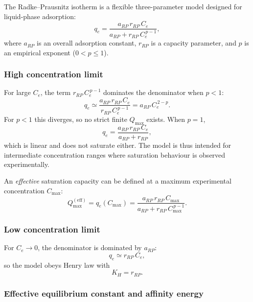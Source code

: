 	The Radke--Prausnitz isotherm is a flexible three-parameter model
	designed for liquid-phase adsorption:
	\begin{equation}
		q_e = \frac{a_{RP}\, r_{RP}\, C_e}{a_{RP} + r_{RP}\, C_e^{\,p-1}},
		\label{eq:RadkePrausnitz}
	\end{equation}
	where $a_{RP}$ is an overall adsorption constant, $r_{RP}$ is a
	capacity parameter, and $p$ is an empirical exponent
	($0 < p \leq 1$).

	\subsubsection{High concentration limit}

	For large $C_e$, the term $r_{RP}\,C_e^{\,p-1}$ dominates the
	denominator when $p < 1$:
	\begin{equation}
		q_e \simeq \frac{a_{RP}\, r_{RP}\, C_e}{r_{RP}\, C_e^{\,p-1}}
		= a_{RP}\, C_e^{\,2-p}.
	\end{equation}
	For $p < 1$ this diverges, so no strict finite $Q_{\max}$ exists.
	When $p = 1$,
	\begin{equation}
		q_e = \frac{a_{RP}\, r_{RP}\, C_e}{a_{RP} + r_{RP}},
	\end{equation}
	which is linear and does not saturate either.  The model is thus
	intended for intermediate concentration ranges where saturation
	behaviour is observed experimentally.

	An \emph{effective} saturation capacity can be defined at a
	maximum experimental concentration $C_{\max}$:
	\begin{equation}
		Q_{\max}^{\mathrm{(eff)}} = q_e(C_{\max})
		= \frac{a_{RP}\, r_{RP}\, C_{\max}}
		{a_{RP} + r_{RP}\, C_{\max}^{\,p-1}}.
	\end{equation}

	\subsubsection{Low concentration limit}

	For $C_e \to 0$, the denominator is dominated by $a_{RP}$:
	\begin{equation}
		q_e \simeq r_{RP}\, C_e,
	\end{equation}
	so the model obeys Henry law with
	\begin{equation}
		\boxed{K_H = r_{RP}.}
	\end{equation}

	\subsubsection{Effective equilibrium constant and affinity energy}

